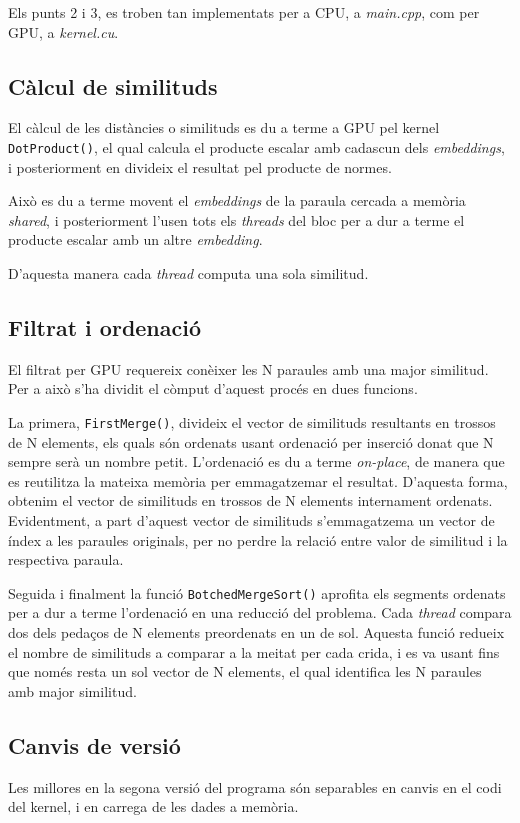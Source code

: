 \documentclass[catalan,10pt,a4paper]{article}
\begin{document}
Els punts 2 i 3, es troben tan implementats per a CPU, a \textit{main.cpp}, com per GPU, a \textit{kernel.cu}.

\subsection*{Càlcul de similituds}
El càlcul de les distàncies o similituds es du a terme a GPU pel kernel \verb|DotProduct()|, el qual calcula el producte escalar amb cadascun dels \textit{embeddings}, i posteriorment en divideix el resultat pel producte de normes.

Això es du a terme movent el \textit{embeddings} de la paraula cercada a memòria \textit{shared}, i posteriorment l'usen tots els \textit{threads} del bloc per a dur a terme el producte escalar amb un altre \textit{embedding}.

D'aquesta manera cada \textit{thread} computa una sola similitud.

\subsection*{Filtrat i ordenació}
El filtrat per GPU requereix conèixer les N paraules amb una major similitud. Per a això s'ha dividit el còmput d'aquest procés en dues funcions.

La primera, \verb|FirstMerge()|, divideix el vector de similituds resultants en trossos de N elements, els quals són ordenats usant ordenació per inserció donat que N sempre serà un nombre petit. L'ordenació es du a terme \textit{on-place}, de manera que es reutilitza la mateixa memòria per emmagatzemar el resultat.\newline
D'aquesta forma, obtenim el vector de similituds en trossos de N elements internament ordenats. Evidentment, a part d'aquest vector de similituds s'emmagatzema un vector de índex a les paraules originals, per no perdre la relació entre valor de similitud i la respectiva paraula.

Seguida i finalment la funció \verb|BotchedMergeSort()| aprofita els segments ordenats per a dur a terme l'ordenació en una reducció del problema. Cada \textit{thread} compara dos dels pedaços de N elements preordenats en un de sol.\newline
Aquesta funció redueix el nombre de similituds a comparar a la meitat per cada crida, i es va usant fins que només resta un sol vector de N elements, el qual identifica les N paraules amb major similitud.

\subsection*{Canvis de versió}
Les millores en la segona versió del programa són separables en canvis en el codi del kernel, i en carrega de les dades a memòria.
\end{document}
